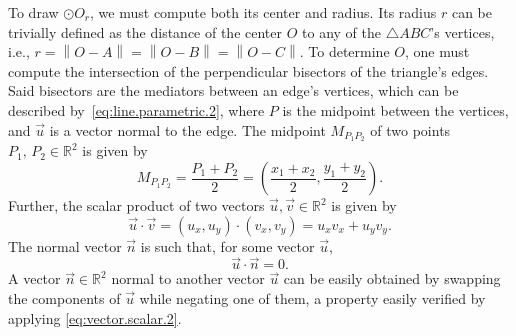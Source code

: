 \begin{comment}
Let $A \in \mathbb{R}^{2 \times 2}$ be the matrix whose columns are the vectors
$\vec{AB} = (a, b)$ and $\vec{AC} = (c, d)$, for instance, such that
%
\begin{equation}\label{eq:matrix.det.2x2}
  \det(A) = \begin{vmatrix}
              a & c\\
              b & d
            \end{vmatrix}%
          = ad - cb
\end{equation}
% 
If the determinant is found to be $0$, then there is no possible solution.
Otherwise, one can proceed to draw $\odot O_r$.
\end{comment}

To draw $\odot O_r$, we must compute both its center and radius.  Its radius $r$
can be trivially defined as the distance of the center $O$ to any of the
$\triangle ABC$'s vertices, i.e., $r = \left\|O - A\right\| = \left\|O -
B\right\| = \left\|O - C\right\|$.  To determine $O$, one must compute the
intersection of the perpendicular bisectors of the triangle's edges.  Said
bisectors are the mediators between an edge's vertices, which can be described
by~\cref{eq:line.parametric.2}, where $P$ is the midpoint between the vertices,
and $\vec{u}$ is a vector normal to the edge.  The midpoint $M_{P_1P_2}$ of two
points $P_1,\,P_2 \in \mathbb{R}^2$ is given by
\begin{equation}\label{eq:midpoint.2}
  M_{P_1P_2} = \frac{P_1 + P_2}{2}%
             = \left(\frac{x_1 + x_2}{2}, \frac{y_1 + y_2}{2}\right).
\end{equation}
Further, the scalar product of two vectors $\vec{u}, \vec{v} \in \mathbb{R}^2$
is given by
\begin{equation}\label{eq:vector.scalar.2}
  \vec{u} \cdot \vec{v} = (u_x, u_y) \cdot (v_x, v_y) = u_x v_x + u_y v_y.
\end{equation}
The normal vector $\vec{n}$ is such that, for some vector $\vec{u}$,
\[ \vec{u} \cdot \vec{n} = 0. \]
A vector $\vec{n} \in \mathbb{R}^2$ normal to another vector $\vec{u}$ can be
easily obtained by swapping the components of $\vec{u}$ while negating one of
them, a property easily verified by applying \cref{eq:vector.scalar.2}.

